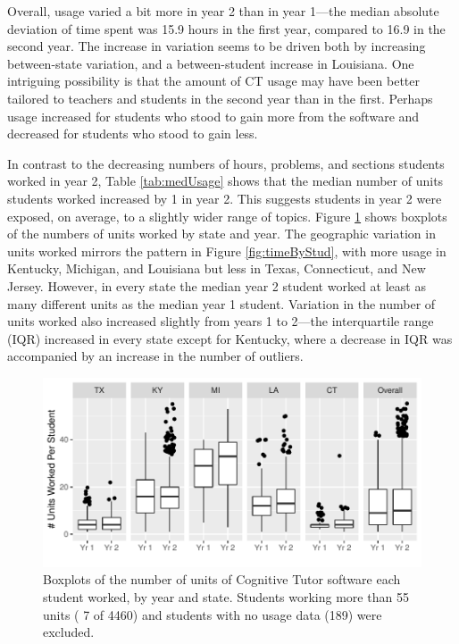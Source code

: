\documentclass[12pt]{article}\usepackage[]{graphicx}\usepackage[]{color}
\makeatletter
\def\maxwidth{ %
  \ifdim\Gin@nat@width>\linewidth
    \linewidth
  \else
    \Gin@nat@width
  \fi
}
\makeatother
\begin{document}
Overall, usage varied a bit more in year 2 than in year
1---the median absolute deviation of time spent was 15.9 hours in the first year, compared to 16.9 in  the second year.
The increase in variation seems to be driven both by increasing
between-state variation, and a between-student increase in Louisiana.
One intriguing possibility is that the amount of CT usage may have been better tailored to
teachers and students in the second year than in the first. Perhaps
usage increased for
students who stood to gain more from the software and decreased for
students who stood to gain less.

In contrast to the decreasing numbers of hours, problems, and sections students
worked in year 2, Table \ref{tab:medUsage} shows that the median number of units
students worked increased by
1
in year 2.
This suggests students in year 2 were exposed, on average, to a
slightly wider range of topics.
Figure \ref{fig:unitsByStud} shows boxplots of the numbers of units
worked by state and year.
The geographic variation in units worked mirrors the pattern in Figure
\ref{fig:timeByStud}, with more usage in Kentucky, Michigan, and
Louisiana but less in Texas, Connecticut, and New Jersey.
However, in every state the median year 2 student worked at least as
many different units as the median year 1 student.
Variation in the number of units worked also increased slightly
from years 1 to 2---the interquartile range (IQR) increased in every state
except for Kentucky, where a decrease in IQR was accompanied by an
increase in the number of outliers.



\begin{figure}
\centering

\includegraphics[width=\maxwidth]{figure/unitsWorked-1} 

\caption{Boxplots of the number of units of Cognitive Tutor
  software each student worked, by year and state. Students
  working more than 55 units (
  7 of
  4460) and students
  with no usage data (189)
  were excluded.}
\label{fig:unitsByStud}
\end{figure}
\end{document}
